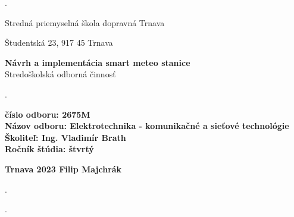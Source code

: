 \begin{titlepage}
    \phantom.
    
    \bigskip
    
    \begin{center}
    {\sc\LARGE Stredná priemyselná škola dopravná Trnava}
    \bigskip
    
    {\sc\large Študentská 23, 917 45 Trnava}
    \break
    \end{center}
    \vspace{4.5cm}
    
    \begin{center}
    
    {\sc\Large{\bf Návrh a implementácia smart meteo stanice\\}}
    \medskip
    {\sc\large Stredoškolská odborná činnosť}
    
    \end{center}
    
    
    \vspace{3cm}
    
    
    
    \phantom.\hfill
    
    {\noindent\sc\small\bf číslo odboru: 2675M\\}
    {\sc\small\bf Názov odboru: Elektrotechnika - komunikačné a sieťové technológie \\}
    {\sc\small\bf Školiteľ: Ing. Vladimír Brath\\ }
    {\sc\small\bf Ročník štúdia: štvrtý\\ }
    
    \medskip
        
    \large\bf Trnava 2023
    \hfill
    \large\bf Filip Majchrák
    
    \hfill\phantom.
    
    
    \phantom.
    \end{titlepage}